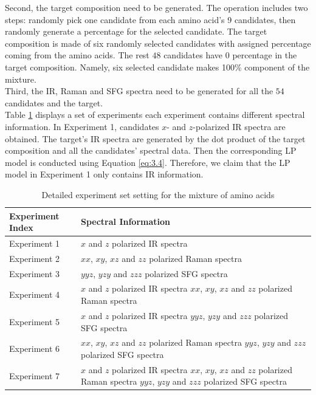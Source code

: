 Second, the target composition need to be generated. The operation includes two steps: randomly pick one candidate from each amino acid's 9 candidates, then randomly generate a percentage for the selected candidate. The target composition is made of six randomly selected candidates with assigned percentage coming from the amino acids. The rest $48$ candidates have $0$ percentage in the target composition. Namely, six selected candidate makes 100\% component of the mixture. \\

Third, the IR, Raman and SFG spectra need to be generated for all the $54$ candidates and the target. \\

Table \ref{tab:5.1} displays a set of experiments each experiment contains different spectral information. In Experiment 1, candidates $x$- and $z$-polarized IR spectra are obtained. The target's IR spectra are generated by the dot product of the target composition and all the candidates' spectral data. Then the corresponding LP model is conducted using Equation \ref{eq:3.4}. Therefore, we claim that the LP model in Experiment 1 only contains IR information.\\

\begin{table}
\begin{center}
{\def\arraystretch{1.5}
\begin{tabular}{| l | p{3in} | }
\hline
Experiment Index & Spectral Information \\
\hline
Experiment 1 & $x$ and $z$ polarized IR spectra\\
\hline
Experiment 2 & $xx$, $xy$, $xz$ and $zz$ polarized Raman spectra \\
\hline
Experiment 3 & $yyz$, $yzy$ and $zzz$ polarized SFG spectra \\
\hline
Experiment 4 & $x$ and $z$ polarized IR spectra \newline $xx$, $xy$, $xz$ and $zz$ polarized Raman spectra \\
\hline
Experiment 5 & $x$ and $z$ polarized IR spectra \newline $yyz$, $yzy$ and $zzz$ polarized SFG spectra　\\
\hline
Experiment 6 & $xx$, $xy$, $xz$ and $zz$ polarized Raman spectra \newline $yyz$, $yzy$ and $zzz$ polarized SFG spectra \\
\hline
Experiment 7 & $x$ and $z$ polarized IR spectra \newline
 $xx$, $xy$, $xz$ and $zz$ polarized Raman spectra \newline 
 $yyz$, $yzy$ and $zzz$ polarized SFG spectra \\
\hline
\end{tabular} 
}
\end{center}
\caption{Detailed experiment set setting for the mixture of amino acids} 
\label{tab:5.1} 
\end{table}	

